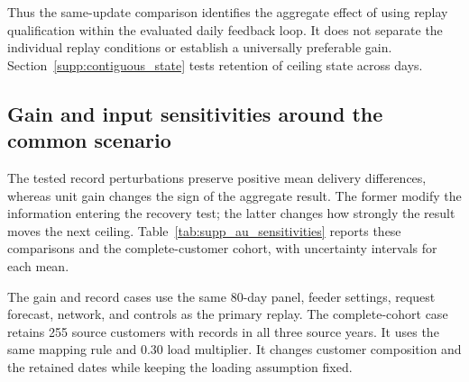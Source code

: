 \documentclass[11pt]{article}
\begin{document}
Thus the same-update comparison identifies the aggregate effect of using
replay qualification within the evaluated daily feedback loop. It does not
separate the individual replay conditions or establish a universally preferable
gain. Section~\ref{supp:contiguous_state} tests retention of ceiling state
across days.

\subsection{Gain and input sensitivities around the common scenario}
\label{supp:au_sensitivity}

The tested record perturbations preserve positive mean delivery differences,
whereas unit gain changes the sign of the aggregate result. The former modify
the information entering the recovery test; the latter changes how strongly the
result moves the next ceiling. Table~\ref{tab:supp_au_sensitivities} reports
these comparisons and the complete-customer cohort, with uncertainty intervals
for each mean.

The gain and record cases use the same 80-day panel, feeder settings, request
forecast, network, and controls as the primary replay. The complete-cohort case
retains 255 source customers with records in all three source years. It uses the
same mapping rule and 0.30 load multiplier. It changes customer composition
and the retained dates while keeping the loading assumption fixed.
\end{document}
